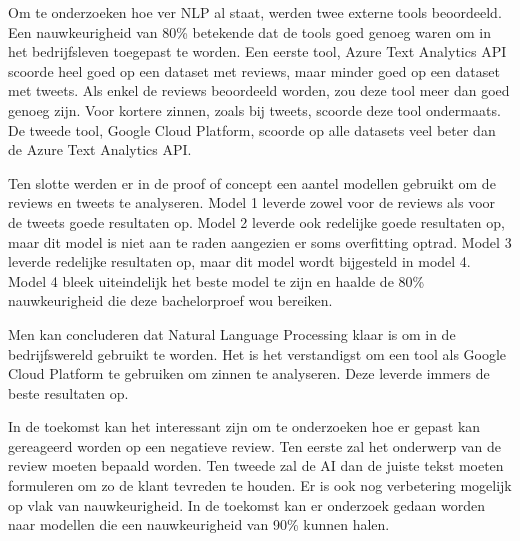 Om te onderzoeken hoe ver NLP al staat, werden twee externe tools beoordeeld. Een nauwkeurigheid van 80\% betekende dat de tools goed genoeg waren om in het bedrijfsleven toegepast te worden. Een eerste tool, Azure Text Analytics API scoorde heel goed op een dataset met reviews, maar minder goed op een dataset met tweets. Als enkel de reviews beoordeeld worden, zou deze tool meer dan goed genoeg zijn. Voor kortere zinnen, zoals bij tweets, scoorde deze tool ondermaats. De tweede tool, Google Cloud Platform, scoorde op alle datasets veel beter dan de Azure Text Analytics API. 

Ten slotte werden er in de proof of concept een aantel modellen gebruikt om de reviews en tweets te analyseren. Model 1 leverde zowel voor de reviews als voor de tweets goede resultaten op. Model 2 leverde ook redelijke goede resultaten op, maar dit model is niet aan te raden aangezien er soms overfitting optrad. Model 3 leverde redelijke resultaten op, maar dit model wordt bijgesteld in model 4. Model 4 bleek uiteindelijk het beste model te zijn en haalde de 80\% nauwkeurigheid die deze bachelorproef wou bereiken.

Men kan concluderen dat Natural Language Processing klaar is om in de bedrijfswereld gebruikt te worden. Het is het verstandigst om een tool als Google Cloud Platform te gebruiken om zinnen te analyseren. Deze leverde immers de beste resultaten op.

In de toekomst kan het interessant zijn om te onderzoeken hoe er gepast kan gereageerd worden op een negatieve review. Ten eerste zal het onderwerp van de review moeten bepaald worden. Ten tweede zal de AI dan de juiste tekst moeten formuleren om zo de klant tevreden te houden. Er is ook nog verbetering mogelijk op vlak van nauwkeurigheid. In de toekomst kan er onderzoek gedaan worden naar modellen die een nauwkeurigheid van 90\% kunnen halen.








